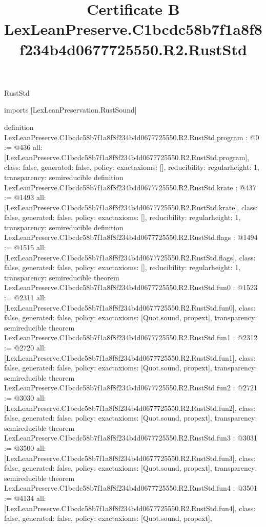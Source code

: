 \begin{lexlean}{RustStd}
\title{Certificate B LexLeanPreserve.C1bcdc58b7f1a8f8f234b4d0677725550.R2.RustStd}
\begin{coremodule}
imports [LexLeanPreservation.RustSound]

definition LexLeanPreserve.C1bcdc58b7f1a8f8f234b4d0677725550.R2.RustStd.program : @0 := @436 {
  all: [LexLeanPreserve.C1bcdc58b7f1a8f8f234b4d0677725550.R2.RustStd.program],
  class: false,
  generated: false,
  policy: exact{axioms: []},
  reducibility: regular{height: 1},
  transparency: semireducible
}
definition LexLeanPreserve.C1bcdc58b7f1a8f8f234b4d0677725550.R2.RustStd.krate : @437 := @1493 {
  all: [LexLeanPreserve.C1bcdc58b7f1a8f8f234b4d0677725550.R2.RustStd.krate],
  class: false,
  generated: false,
  policy: exact{axioms: []},
  reducibility: regular{height: 1},
  transparency: semireducible
}
definition LexLeanPreserve.C1bcdc58b7f1a8f8f234b4d0677725550.R2.RustStd.flags : @1494 := @1515 {
  all: [LexLeanPreserve.C1bcdc58b7f1a8f8f234b4d0677725550.R2.RustStd.flags],
  class: false,
  generated: false,
  policy: exact{axioms: []},
  reducibility: regular{height: 1},
  transparency: semireducible
}
theorem LexLeanPreserve.C1bcdc58b7f1a8f8f234b4d0677725550.R2.RustStd.fun0 : @1523 := @2311 {
  all: [LexLeanPreserve.C1bcdc58b7f1a8f8f234b4d0677725550.R2.RustStd.fun0],
  class: false,
  generated: false,
  policy: exact{axioms: [Quot.sound, propext]},
  transparency: semireducible
}
theorem LexLeanPreserve.C1bcdc58b7f1a8f8f234b4d0677725550.R2.RustStd.fun1 : @2312 := @2720 {
  all: [LexLeanPreserve.C1bcdc58b7f1a8f8f234b4d0677725550.R2.RustStd.fun1],
  class: false,
  generated: false,
  policy: exact{axioms: [Quot.sound, propext]},
  transparency: semireducible
}
theorem LexLeanPreserve.C1bcdc58b7f1a8f8f234b4d0677725550.R2.RustStd.fun2 : @2721 := @3030 {
  all: [LexLeanPreserve.C1bcdc58b7f1a8f8f234b4d0677725550.R2.RustStd.fun2],
  class: false,
  generated: false,
  policy: exact{axioms: [Quot.sound, propext]},
  transparency: semireducible
}
theorem LexLeanPreserve.C1bcdc58b7f1a8f8f234b4d0677725550.R2.RustStd.fun3 : @3031 := @3500 {
  all: [LexLeanPreserve.C1bcdc58b7f1a8f8f234b4d0677725550.R2.RustStd.fun3],
  class: false,
  generated: false,
  policy: exact{axioms: [Quot.sound, propext]},
  transparency: semireducible
}
theorem LexLeanPreserve.C1bcdc58b7f1a8f8f234b4d0677725550.R2.RustStd.fun4 : @3501 := @4134 {
  all: [LexLeanPreserve.C1bcdc58b7f1a8f8f234b4d0677725550.R2.RustStd.fun4],
  class: false,
  generated: false,
  policy: exact{axioms: [Quot.sound, propext]},
}
\end{coremodule}
\end{lexlean}
